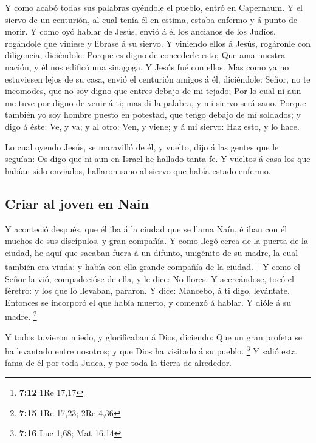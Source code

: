  Y como acabó todas sus palabras oyéndole el pueblo, entró
en Capernaum.  Y el siervo de un centurión, al cual tenía
él en estima, estaba enfermo y á punto de morir.  Y como
oyó hablar de Jesús, envió á él los ancianos de los Judíos, rogándole
que viniese y librase á su siervo.  Y viniendo ellos á
Jesús, rogáronle con diligencia, diciéndole: Porque es digno de
concederle esto;  Que ama nuestra nación, y él nos edificó
una sinagoga.  Y Jesús fué con ellos. Mas como ya no
estuviesen lejos de su casa, envió el centurión amigos á él, diciéndole:
Señor, no te incomodes, que no soy digno que entres debajo de mi tejado;
 Por lo cual ni aun me tuve por digno de venir á ti; mas
di la palabra, y mi siervo será sano.  Porque también yo
soy hombre puesto en potestad, que tengo debajo de mí soldados; y digo á
éste: Ve, y va; y al otro: Ven, y viene; y á mi siervo: Haz esto, y lo
hace.

 Lo cual oyendo Jesús, se maravilló de él, y vuelto, dijo
á las gentes que le seguían: Os digo que ni aun en Israel he hallado
tanta fe.  Y vueltos á casa los que habían sido enviados,
hallaron sano al siervo que había estado enfermo.

\hypertarget{criar-al-joven-en-nain}{%
\subsection{Criar al joven en Nain}\label{criar-al-joven-en-nain}}

 Y aconteció después, que él iba á la ciudad que se llama
Naín, é iban con él muchos de sus discípulos, y gran compañía.
 Y como llegó cerca de la puerta de la ciudad, he aquí
que sacaban fuera á un difunto, unigénito de su madre, la cual también
era viuda: y había con ella grande compañía de la ciudad. \footnote{\textbf{7:12}
  1Re 17,17}  Y como el Señor la vió, compadecióse de
ella, y le dice: No llores.  Y acercándose, tocó el
féretro: y los que lo llevaban, pararon. Y dice: Mancebo, á ti digo,
levántate.  Entonces se incorporó el que había muerto, y
comenzó á hablar. Y dióle á su madre. \footnote{\textbf{7:15} 1Re 17,23;
  2Re 4,36}

 Y todos tuvieron miedo, y glorificaban á Dios, diciendo:
Que un gran profeta se ha levantado entre nosotros; y que Dios ha
visitado á su pueblo. \footnote{\textbf{7:16} Luc 1,68; Mat 16,14}
 Y salió esta fama de él por toda Judea, y por toda la
tierra de alrededor.

